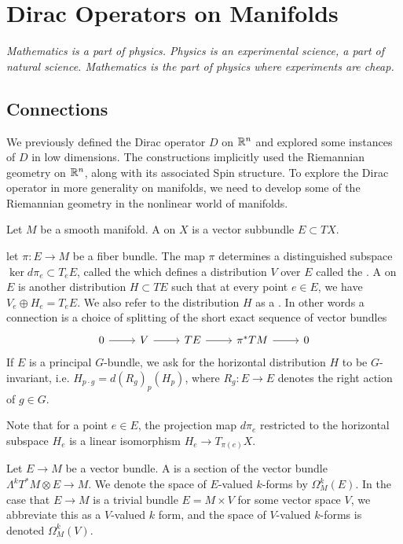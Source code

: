 \chapter{Dirac Operators on Manifolds}
%
\subsectionend $ $\\
%
\emph{Mathematics is a part of physics. Physics is an experimental science, a part of
natural science. Mathematics is the part of physics where experiments are cheap.} \\
%
%
\subsectionend
%
\section{Connections}
%
We previously defined the Dirac operator $D$ on $\mathbb{R}^n$ and explored some
instances of $D$ in low dimensions. The constructions implicitly used the
Riemannian geometry on $\mathbb{R}^n$, along with its associated Spin structure.
To explore the Dirac operator in more generality on manifolds, we need to
develop some of the Riemannian geometry in the nonlinear world of manifolds.
%
\begin{defn}
Let $M$ be a smooth manifold. A  on $X$ is a vector subbundle
$E \subset TX$.
\end{defn}
%
\begin{defn}
let $\pi : E \to M$ be a fiber bundle. The map $\pi$ determines a distinguished
subspace $\ker d\pi_e \subset T_eE$, called the 
which defines a distribution $V$ over $E$ called the .
A  on $E$ is another distribution $H \subset TE$ such that
at every point $e \in E$, we have $V_e \oplus H_e = T_eE$. We also refer to the
distribution $H$ as a . In other words a connection
is a choice of splitting of the short exact sequence of vector bundles
\[\begin{tikzcd}
0 \ar[r] & V \ar[r] & TE \ar[r] & \pi^*TM \ar[r] & 0
\end{tikzcd}\]
If $E$ is a principal $G$-bundle, we ask for the horizontal distribution $H$
to be $G$-invariant, i.e. $H_{p \cdot g} = d(R_g)_p(H_p)$, where $R_g : E \to E$
denotes the right action of $g \in G$.
\end{defn}
%
Note that for a point $e \in E$, the projection map $d\pi_e$ restricted to
the horizontal subspace $H_e$ is a linear isomorphism $H_e \to T_{\pi(e)}X$.
%
\begin{defn}
Let $E \to M$ be a vector bundle. A  is a section of
the vector bundle $\Lambda^kT^*M \otimes E \to M$. We denote the space of
$E$-valued $k$-forms by $\Omega_M^k(E)$. In the case that $E \to M$ is a
trivial bundle $E = M \times V$ for some vector space $V$, we abbreviate
this as a $V$-valued $k$ form, and the space of $V$-valued $k$-forms is denoted
$\Omega_M^k(V)$.
\end{defn}

